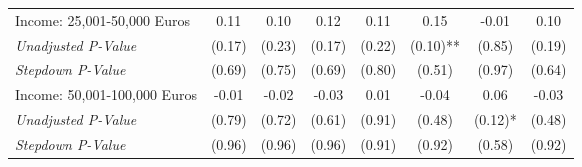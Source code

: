 \begin{tabular}{l c c c c c c c}
Income: 25,001-50,000 Euros & 0.11 & 0.10 & 0.12 & 0.11 & 0.15 & -0.01 & 0.10 \\
\quad \textit{Unadjusted P-Value} & (0.17) & (0.23) & (0.17) & (0.22) & (0.10)** & (0.85) & (0.19) \\
\quad \textit{Stepdown P-Value} & (0.69) & (0.75) & (0.69) & (0.80) & (0.51) & (0.97) & (0.64) \\
Income: 50,001-100,000 Euros & -0.01 & -0.02 & -0.03 & 0.01 & -0.04 & 0.06 & -0.03 \\
\quad \textit{Unadjusted P-Value} & (0.79) & (0.72) & (0.61) & (0.91) & (0.48) & (0.12)* & (0.48) \\
\quad \textit{Stepdown P-Value} & (0.96) & (0.96) & (0.96) & (0.91) & (0.92) & (0.58) & (0.92) \\
\bottomrule
\end{tabular}
